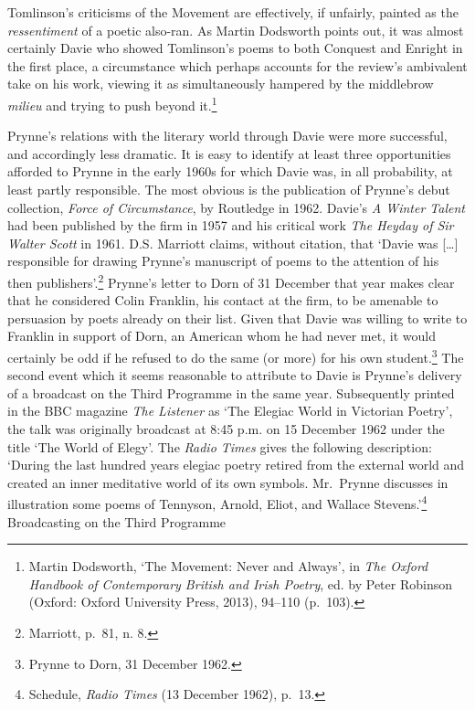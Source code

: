 \documentclass[]{article}
\begin{document}
\noindent Tomlinson’s criticisms of the Movement are effectively, if
unfairly, painted as the \emph{ressentiment} of a poetic also-ran. As
Martin Dodsworth points out, it was almost certainly Davie who showed
Tomlinson’s poems to both Conquest and Enright in the first place, a
circumstance which perhaps accounts for the review’s ambivalent take on
his work, viewing it as simultaneously hampered by the middlebrow
\emph{milieu} and trying to push beyond it.\footnote{Martin Dodsworth,
  ‘The Movement: Never and Always’, in \emph{The Oxford Handbook of
  Contemporary British and Irish Poetry}, ed. by Peter Robinson (Oxford:
  Oxford University Press, 2013), 94–110 (p.~103).}

Prynne’s relations with the literary world through Davie were more
successful, and accordingly less dramatic. It is easy to identify at
least three opportunities afforded to Prynne in the early 1960s for
which Davie was, in all probability, at least partly responsible. The
most obvious is the publication of Prynne’s debut collection,
\emph{Force of Circumstance}, by Routledge in 1962. Davie’s \emph{A
Winter Talent} had been published by the firm in 1957 and his critical
work \emph{The Heyday of Sir Walter Scott} in 1961. D.S. Marriott
claims, without citation, that ‘Davie was {[}\ldots{}{]} responsible for
drawing Prynne’s manuscript of poems to the attention of his then
publishers’.\footnote{Marriott, p.~81, n. 8.} Prynne’s letter to Dorn of
31 December that year makes clear that he considered Colin Franklin, his
contact at the firm, to be amenable to persuasion by poets already on
their list. Given that Davie was willing to write to Franklin in support
of Dorn, an American whom he had never met, it would certainly be odd if
he refused to do the same (or more) for his own student.\footnote{Prynne
  to Dorn, 31 December 1962.} The second event which it seems reasonable
to attribute to Davie is Prynne’s delivery of a broadcast on the Third
Programme in the same year. Subsequently printed in the BBC magazine
\emph{The Listener} as ‘The Elegiac World in Victorian Poetry’, the talk
was originally broadcast at 8:45 p.m. on 15 December 1962 under the
title ‘The World of Elegy’. The \emph{Radio Times} gives the following
description: ‘During the last hundred years elegiac poetry retired from
the external world and created an inner meditative world of its own
symbols. Mr.~Prynne discusses in illustration some poems of Tennyson,
Arnold, Eliot, and Wallace Stevens.’\footnote{Schedule, \emph{Radio
  Times} (13 December 1962), p.~13.} Broadcasting on the Third Programme
\end{document}
